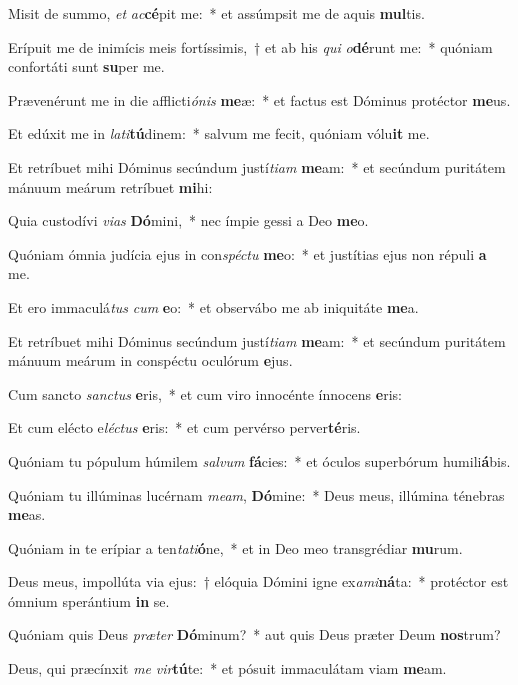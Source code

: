 \item Misit de summo, \textit{et} \textit{ac}\textbf{cé}pit me:~* et assúmpsit me de aquis \textbf{mul}tis.
\item Erípuit me de inimícis meis fortíssimis,~† et ab his \textit{qui} \textit{o}\textbf{dé}runt me:~* quóniam confortáti sunt \textbf{su}per me.
\item Prævenérunt me in die afflicti\textit{ó}\textit{nis} \textbf{me}æ:~* et factus est Dóminus protéctor \textbf{me}us.
\item Et edúxit me in \textit{la}\textit{ti}\textbf{tú}dinem:~* salvum me fecit, quóniam vólu\textbf{it} me.
\item Et retríbuet mihi Dóminus secúndum justí\textit{ti}\textit{am} \textbf{me}am:~* et secúndum puritátem mánuum meárum retríbuet \textbf{mi}hi:
\item Quia custodívi \textit{vi}\textit{as} \textbf{Dó}mini,~* nec ímpie gessi a Deo \textbf{me}o.
\item Quóniam ómnia judícia ejus in con\textit{spéc}\textit{tu} \textbf{me}o:~* et justítias ejus non répuli \textbf{a} me.
\item Et ero immaculá\textit{tus} \textit{cum} \textbf{e}o:~* et observábo me ab iniquitáte \textbf{me}a.
\item Et retríbuet mihi Dóminus secúndum justí\textit{ti}\textit{am} \textbf{me}am:~* et secúndum puritátem mánuum meárum in conspéctu oculórum \textbf{e}jus.
\item Cum sancto \textit{sanc}\textit{tus} \textbf{e}ris,~* et cum viro innocénte ínnocens \textbf{e}ris:
\item Et cum elécto e\textit{léc}\textit{tus} \textbf{e}ris:~* et cum pervérso perver\textbf{té}ris.
\item Quóniam tu pópulum húmilem \textit{sal}\textit{vum} \textbf{fá}cies:~* et óculos superbórum humili\textbf{á}bis.
\item Quóniam tu illúminas lucérnam \textit{me}\textit{am}, \textbf{Dó}mine:~* Deus meus, illúmina ténebras \textbf{me}as.
\item Quóniam in te erípiar a ten\textit{ta}\textit{ti}\textbf{ó}ne,~* et in Deo meo transgrédiar \textbf{mu}rum.
\item Deus meus, impollúta via ejus:~† elóquia Dómini igne ex\textit{a}\textit{mi}\textbf{ná}ta:~* protéctor est ómnium sperántium \textbf{in} se.
\item Quóniam quis Deus \textit{præ}\textit{ter} \textbf{Dó}minum?~* aut quis Deus præter Deum \textbf{nos}trum?
\item Deus, qui præcínxit \textit{me} \textit{vir}\textbf{tú}te:~* et pósuit immaculátam viam \textbf{me}am.
